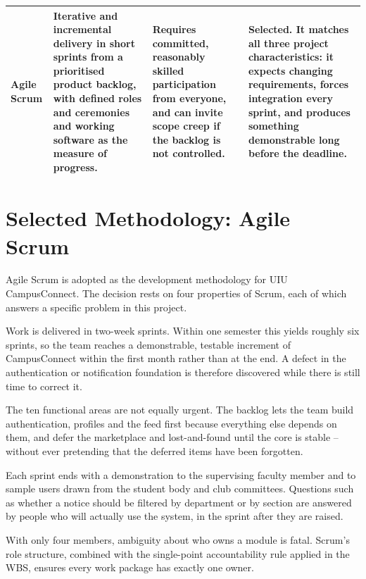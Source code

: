\documentclass[11pt,a4paper]{report}
\begin{document}
\begin{longtable}{|L{2.1cm}|L{3.5cm}|L{3.3cm}|L{4.6cm}|}
\textbf{Agile Scrum} &
Iterative and incremental delivery in short sprints from a prioritised product
backlog, with defined roles and ceremonies and working software as the measure
of progress. &
Requires committed, reasonably skilled participation from everyone, and can
invite scope creep if the backlog is not controlled. &
\textbf{Selected.} It matches all three project characteristics: it expects
changing requirements, forces integration every sprint, and produces something
demonstrable long before the deadline. \\ \hline

\end{longtable}

\section{Selected Methodology: Agile Scrum}

Agile Scrum is adopted as the development methodology for UIU CampusConnect. The
decision rests on four properties of Scrum, each of which answers a specific
problem in this project.

\begin{description}[leftmargin=0pt,style=unboxed,itemsep=6pt]
  \item[Short, timeboxed sprints.] Work is delivered in two-week sprints. Within
  one semester this yields roughly six sprints, so the team reaches a
  demonstrable, testable increment of CampusConnect within the first month
  rather than at the end. A defect in the authentication or notification
  foundation is therefore discovered while there is still time to correct it.

  \item[A prioritised product backlog.] The ten functional areas are not equally
  urgent. The backlog lets the team build authentication, profiles and the feed
  first because everything else depends on them, and defer the marketplace and
  lost-and-found until the core is stable -- without ever pretending that the
  deferred items have been forgotten.

  \item[Frequent stakeholder feedback.] Each sprint ends with a demonstration to
  the supervising faculty member and to sample users drawn from the student body
  and club committees. Questions such as whether a notice should be filtered by
  department or by section are answered by people who will actually use the
  system, in the sprint after they are raised.

  \item[Clear ownership through defined roles.] With only four members, ambiguity
  about who owns a module is fatal. Scrum's role structure, combined with the
  single-point accountability rule applied in the WBS, ensures every work
  package has exactly one owner.
\end{description}
\end{document}
